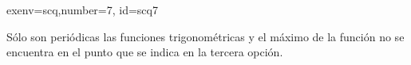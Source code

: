 \begin{SolutionCollapsible}{exenv=scq,number=7, id=scq7}

		Sólo son periódicas las funciones trigonométricas y el máximo de la función no se encuentra en el punto que se indica en la tercera opción.
	
\end{SolutionCollapsible}
